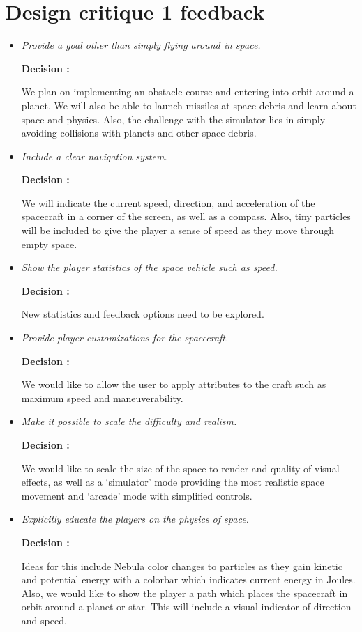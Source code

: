 \section*{Design critique 1 feedback}

\begin{itemize}
  \item \emph{Provide a goal other than simply flying around in space.}
        
        \textbf{Decision : } \parbox[t]{5in}{We plan on implementing an obstacle course and entering into orbit around a planet.  We will also be able to launch missiles at space debris and learn about space and physics.  Also, the challenge with the simulator lies in simply avoiding collisions with planets and other space debris.}

  \item \emph{Include a clear navigation system.}
        
        \textbf{Decision : } \parbox[t]{5in}{We will indicate the current speed, direction, and acceleration of the spacecraft in a corner of the screen, as well as a compass.  Also, tiny particles will be included to give the player a sense of speed as they move through empty space.}

  \item \emph{Show the player statistics of the space vehicle such as speed.}
        
        \textbf{Decision : } \parbox[t]{5in}{New statistics and feedback options need to be explored.}

  \item \emph{Provide player customizations for the spacecraft.}
        
        \textbf{Decision : } \parbox[t]{5in}{We would like to allow the user to apply attributes to the craft such as maximum speed and maneuverability.}

  \item \emph{Make it possible to scale the difficulty and realism.}
        
        \textbf{Decision : } \parbox[t]{5in}{We would like to scale the size of the space to render and quality of visual effects, as well as a `simulator' mode providing the most realistic space movement and `arcade' mode with simplified controls.}

  \item \emph{Explicitly educate the players on the physics of space.}
        
        \textbf{Decision : } \parbox[t]{5in}{Ideas for this include Nebula color changes to particles as they gain kinetic and potential energy with a colorbar which indicates current energy in Joules.  Also, we would like to show the player a path which places the spacecraft in orbit around a planet or star.  This will include a visual indicator of direction and speed.}


\end{itemize}
